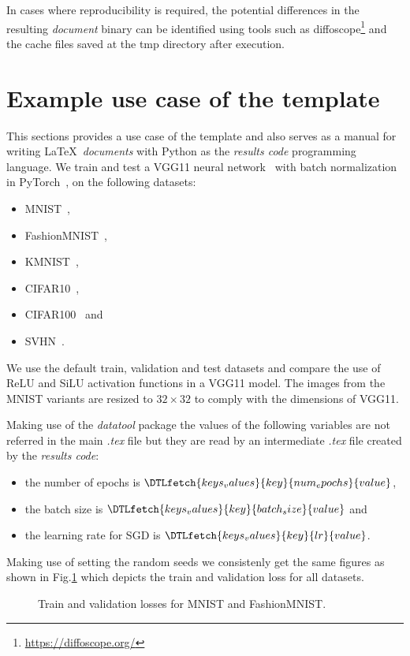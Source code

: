 \documentclass[journal]{IEEEtran}
\begin{document}
In cases where reproducibility is required, the potential differences in the resulting \textit{document} binary can be identified using tools such as diffoscope\footnote{\url{https://diffoscope.org/}} and the cache files saved at the tmp directory after execution.

\section{Example use case of the template}
This sections provides a use case of the template and also serves as a manual for writing \LaTeX\ \textit{documents} with Python as the \textit{results code} programming language.
We train and test a VGG11 neural network~\cite{simonyan2014very} with batch normalization in PyTorch~\cite{paszke2019pytorch}, on the following datasets:
\begin{itemize}
	\item MNIST~\cite{lecun2010mnist},
	\item FashionMNIST~\cite{xiao2017fashion},
	\item KMNIST~\cite{clanuwat2018deep},
	\item CIFAR10~\cite{krizhevsky2009learning},
	\item CIFAR100~\cite{krizhevsky2009learning} and
	\item SVHN~\cite{netzer2011reading}.
\end{itemize}

We use the default train, validation and test datasets and compare the use of ReLU\cite{dahl2013improving} and SiLU\cite{elfwing2018sigmoid} activation functions in a VGG11 model.
The images from the MNIST variants are resized to $32\times 32$ to comply with the dimensions of VGG11.

Making use of the \textit{datatool} package the values of the following variables are not referred in the main \textit{.tex} file but they are read by an intermediate \textit{.tex} file created by the \textit{results code}:
\begin{itemize}
	\item the number of epochs is $\DTLfetch{keys_values}{key}{num_epochs}{value}$,
	\item the batch size is $\DTLfetch{keys_values}{key}{batch_size}{value}$ and
	\item the learning rate for SGD is $\DTLfetch{keys_values}{key}{lr}{value}$.
\end{itemize}

Making use of setting the random seeds we consistenly get the same figures as shown in Fig.\ref{fig:image} which depicts the train and validation loss for all datasets.
\begin{figure}[!t]
	\caption{Train and validation losses for MNIST and FashionMNIST.}
	\label{fig:image}
\end{figure}
\end{document}
